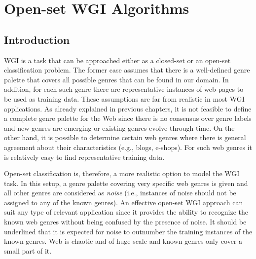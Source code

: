 
\chapter{Open-set WGI Algorithms}

\label{chap:openset}


\newcommand{\keyword}[1]{\textbf{#1}}
\newcommand{\tabhead}[1]{\textbf{#1}}
\newcommand{\code}[1]{\texttt{#1}}
\newcommand{\file}[1]{\texttt{\bfseries#1}}
\newcommand{\option}[1]{\texttt{\itshape#1}}


\section{Introduction}\label{chap:openset:sec:intro}

WGI is a task that can be approached either as a closed-set or an open-set classification problem. The former case assumes that there is a well-defined genre palette that covers all possible genres that can be found in our domain. In addition, for each such genre there are representative instances of web-pages to be used as training data. These assumptions are far from realistic in most WGI applications. As already explained in previous chapters, it is not feasible to define a complete genre palette for the Web since there is no consensus over genre labels and new genres are emerging or existing genres evolve through time. On the other hand, it is possible to determine certain web genres where there is general agreement about their characteristics (e.g., blogs, e-shops). For such web genres it is relatively easy to find representative training data. 

Open-set classification is, therefore, a more realistic option to model the WGI task. In this setup, a genre palette covering very specific web genres is given and all other genres are considered as \textit{noise} (i.e., instances of noise should not be assigned to any of the known genres). An effective open-set WGI approach can suit any type of relevant application since it provides the ability to recognize the known web genres without being confused by the presence of noise. It should be underlined that it is expected for noise to outnumber the training instances of the known genres. Web is chaotic and of huge scale and known genres only cover a small part of it.

